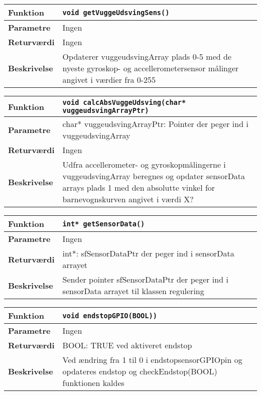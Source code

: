 \begin{center}
    \begin{tabular}{ | l | p{} |}
    \hline
    \textbf{Funktion}	& \verb+void getVuggeUdsvingSens() +				\\ \hline
    \textbf{Parametre} 	& Ingen							 		\\ \hline
    \textbf{Returværdi}	& Ingen									\\ \hline
    \textbf{Beskrivelse}	& Opdaterer vuggeudsvingArray plads 0-5 med de nyeste gyroskop- og accellerometersensor målinger angivet i værdier fra 0-255	\\ \hline
    \end{tabular}
\end{center}

\begin{center}
    \begin{tabular}{ | l | p{} |}
    \hline
    \textbf{Funktion}	& \verb+void calcAbsVuggeUdsving(char* vuggeudsvingArrayPtr) +				\\ \hline
    \textbf{Parametre} 	& char* vuggeudsvingArrayPtr: Pointer der peger ind i vuggeudsvingArray							 		\\ \hline
    \textbf{Returværdi}	& Ingen									\\ \hline
    \textbf{Beskrivelse}	& Udfra accellerometer- og gyroskopmålingerne i vuggeudsvingArray beregnes og opdater sensorData arrays plads 1 med den absolutte vinkel for barnevognskurven angivet i værdi X?	\\ \hline
    \end{tabular}
\end{center}

\begin{center}
    \begin{tabular}{ | l | p{} |}
    \hline
    \textbf{Funktion}	& \verb+int* getSensorData() +				\\ \hline
    \textbf{Parametre} 	& Ingen							 		\\ \hline
    \textbf{Returværdi}	& int*: sfSensorDataPtr der peger ind i sensorData arrayet									\\ \hline
    \textbf{Beskrivelse}	& Sender pointer sfSensorDataPtr der peger ind i sensorData arrayet til klassen regulering	\\ \hline
    \end{tabular}
\end{center}

\begin{center}
    \begin{tabular}{ | l | p{} |}
    \hline
    \textbf{Funktion}	& \verb+void endstopGPIO(BOOL)) +				\\ \hline
    \textbf{Parametre} 	& Ingen							 		\\ \hline
    \textbf{Returværdi}	& BOOL: TRUE ved aktiveret endstop						\\ \hline
    \textbf{Beskrivelse}	& Ved ændring fra 1 til 0 i endstopsensorGPIOpin og opdateres endstop og checkEndstop(BOOL) funktionen kaldes	\\ \hline
    \end{tabular}
\end{center}


